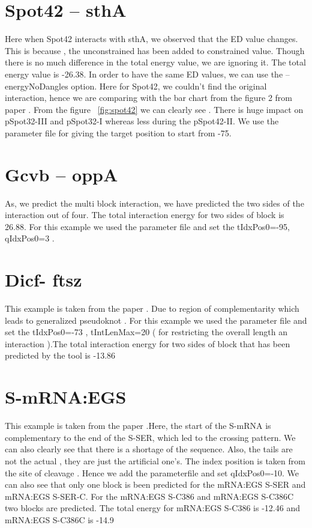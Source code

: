 \documentclass[twoside,a4paper]{report}
\begin{document}
	 \section{Spot42 – sthA }
	 
	  Here when Spot42 interacts with sthA, we observed that the ED value changes. This is because , the unconstrained has been added to constrained value. Though there is no much difference in the total energy value, we are ignoring it. The total energy value is -26.38. In order to have the same ED values, we can use the --energyNoDangles option. Here for Spot42, we couldn't find the original interaction, hence we are comparing with the bar chart from the figure 2 from paper {\citep{beisel2011base}} . From the figure ~\ref{fig:spot42} we can clearly see . There is huge impact on pSpot32-III and pSpot32-I whereas less during the pSpot42-II. We use the parameter file for giving the target position to start from -75.\\
	  
	  \section{Gcvb – oppA }
	As, we predict the multi block interaction, we have predicted the two sides of the interaction out of four. The total interaction energy for two sides of block is 26.88. For this example we used the parameter file and set the tIdxPos0=-95, 
	qIdxPos0=3 . \\
	
	 \section{Dicf- ftsz  }
	 
	 This example is taken from the paper \citep{pervouchine2004iris} . Due to region of complementarity which leads to generalized pseudoknot  . For this example we used the parameter file and set the tIdxPos0=-73 , tIntLenMax=20 ( for restricting the overall length an interaction ).The total interaction energy for two sides of block that has been predicted by the tool is -13.86 \\
	 
	 \section{S-mRNA:EGS  }
	This example is taken from the paper \citep{zhang2013engineered }  .Here, the start of the S-mRNA is complementary to the end of the S-SER, which led to the crossing pattern. We can also clearly see that there is a shortage of the sequence. Also, the tails are not the actual , they are just the artificial one's. The index position is taken from the site of cleavage . Hence we add the parameterfile and set qIdxPos0=-10. We can also see that only one block is been predicted for the mRNA:EGS S-SER and mRNA:EGS S-SER-C. For the mRNA:EGS S-C386 and mRNA:EGS S-C386C two blocks are predicted. The total energy for mRNA:EGS S-C386 is -12.46 and mRNA:EGS S-C386C is -14.9  \\
	 
\end{document}
